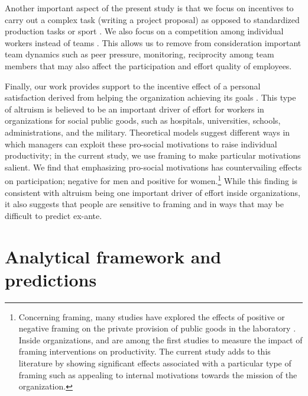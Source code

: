 \documentclass[11pt, titlepage]{article}
\begin{document}
Another important aspect of the present study is that we focus on
incentives to carry out a complex task (writing a project proposal) as
opposed to standardized production tasks \citep{knoeber1994testing} or
sport \citep{ehrenberg1990tournaments}. We also focus on a competition
among individual workers instead of teams
\citep[e.g.,][\citet{hamilton2003team} and more recently
\citet{gibbs2014field}]{erev1993constructive}. This allows us to remove
from consideration important team dynamics such as peer pressure,
monitoring, reciprocity among team members that may also affect the
participation and effort quality of employees.

Finally, our work provides support to the incentive effect of a personal
satisfaction derived from helping the organization achieving its goals
\citep{akerlof2005identity, besley2005competition, delfgaauw2005dedicated, delfgaauw2008incentives, prendergast2007motivation}.
This type of altruism is believed to be an important driver of effort
for workers in organizations for social public goods, such as hospitals,
universities, schools, administrations, and the military. Theoretical
models suggest different ways in which managers can exploit these
pro-social motivations to raise individual productivity; in the current
study, we use framing to make particular motivations salient. We find
that emphasizing pro-social motivations has countervailing effects on
participation; negative for men and positive for women.\footnote{Concerning
  framing, many studies have explored the effects of positive or
  negative framing on the private provision of public goods in the
  laboratory \citep{andreoni1995warm}. Inside organizations,
  \citet{hossain2012behavioralist} and \citet{hong2015framing} are among
  the first studies to measure the impact of framing interventions on
  productivity. The current study adds to this literature by showing
  significant effects associated with a particular type of framing such
  as appealing to internal motivations towards the mission of the
  organization.} While this finding is consistent with altruism being
one important driver of effort inside organizations, it also suggests
that people are sensitive to framing and in ways that may be difficult
to predict ex-ante.

\section{Analytical framework and
predictions}\label{analytical-framework-and-predictions}
\end{document}
